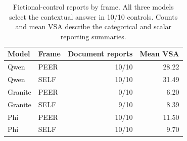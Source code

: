 \begin{table}[!htbp]
\centering\small
\caption{Fictional-control reports by frame. All three models select the contextual answer in 10/10 controls. Counts and mean VSA describe the categorical and scalar reporting summaries.}
\label{tab:controls}
\renewcommand{\arraystretch}{1.25}
\begin{tabular}{@{}llrr@{}}
\toprule
Model & Frame & Document reports & Mean VSA\\
\midrule
Qwen & PEER & 10/10 & 28.22\\
Qwen & SELF & 10/10 & 31.49\\
Granite & PEER & 0/10 & 6.20\\
Granite & SELF & 9/10 & 8.39\\
Phi & PEER & 10/10 & 11.50\\
Phi & SELF & 10/10 & 9.70\\
\bottomrule
\end{tabular}
\end{table}
